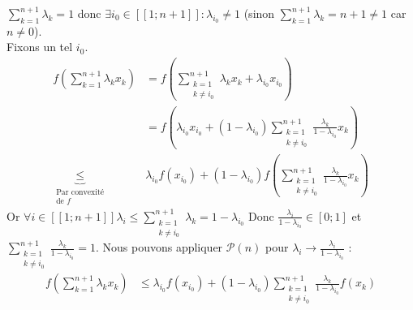 \documentclass{article}
\renewenvironment{question_kholle}[2][ ]
{
	\subsection{\texorpdfstring{#2}{}}
	\notblank{#1}
	{
		\noindent #1
		\bigbreak
	}
	{}
	\begin{proof}
}
{
	\end{proof}
}
\begin{document}
\begin{question_kholle}
\begin{itemize}[label=*, leftmargin=0.5cm]
			$\sum_{k=1}^{n+1} \lambda_k = 1$ donc $\exists i_0 \in [\![1;n+1]\!] : \lambda_{i_0} \neq 1$ (sinon $\sum_{k=1}^{n+1} \lambda_k = n+1 \neq 1$ car $n \neq 0$). \\
			Fixons un tel $i_0$.
			\begin{equation*}
				\begin{aligned}
					f\left( \sum_{k=1}^{n+1} \lambda_k x_k \right)
					&= f\left( \sum_{\begin{array}{c} k = 1 \\ k \neq i_0 \end{array}}^{n+1} \lambda_k x_k + \lambda_{i_0} x_{i_0} \right) \\
					&= f\left( \lambda_{i_0} x_{i_0} + \left( 1 - \lambda_{i_0} \right) \sum_{\begin{array}{c} k = 1 \\ k \neq i_0 \end{array}}^{n+1} \frac{\lambda_k}{1 - \lambda_{i_0}} x_k \right) \\
					\underbrace{\leqslant}_{\begin{array}{c} \text{Par convexité} \\ \text{de } f \end{array}}& \lambda_{i_0} f(x_{i_0}) + \left( 1 - \lambda_{i_0} \right) f\left( \sum_{\begin{array}{c} k = 1 \\ k \neq i_0 \end{array}}^{n+1} \frac{\lambda_k}{1 - \lambda_{i_0}} x_k \right)
				\end{aligned}
			\end{equation*}
			Or $\displaystyle \forall i \in [\![1;n+1]\!] \lambda_i \leqslant \sum_{\begin{array}{c} k = 1 \\ k \neq i_0 \end{array}}^{n+1} \lambda_k = 1 - \lambda_{i_0}$ Donc $\displaystyle \frac{\lambda_i}{1 - \lambda_{i_0}} \in [0;1]$ et $\displaystyle \sum_{\begin{array}{c} k = 1 \\ k \neq i_0 \end{array}}^{n+1} \frac{\lambda_k}{1 - \lambda_{i_0}} = 1$. Nous pouvons appliquer $\mathcal{P}(n)$ pour $\lambda_i \rightarrow \frac{\lambda_i}{1 - \lambda_{i_0}}$ :
			\begin{equation*}
				\begin{aligned}
					f\left( \sum_{k=1}^{n+1} \lambda_k x_k \right)
					&\leqslant \lambda_{i_0} f(x_{i_0}) + \left( 1 - \lambda_{i_0} \right) \sum_{\begin{array}{c} k = 1 \\ k \neq i_0 \end{array}}^{n+1} \frac{\lambda_k}{1 - \lambda_{i_0}} f\left( x_k \right) \\

\end{aligned}
\end{equation*}
\end{itemize}
\end{question_kholle}
\end{document}

